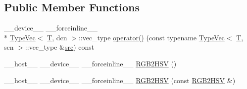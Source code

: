 \subsection*{Public Member Functions}
\begin{DoxyCompactItemize}
\item 
\-\_\-\-\_\-device\-\_\-\-\_\- \-\_\-\-\_\-forceinline\-\_\-\-\_\- \\*
\hyperlink{structcv_1_1gpu_1_1device_1_1TypeVec}{Type\-Vec}$<$ \hyperlink{calib3d_8hpp_a3efb9551a871ddd0463079a808916717}{T}, dcn $>$\-::vec\-\_\-type \hyperlink{structcv_1_1gpu_1_1device_1_1color__detail_1_1RGB2HSV_a51fa9b0ee1e0de31bade9b6a42034452}{operator()} (const typename \hyperlink{structcv_1_1gpu_1_1device_1_1TypeVec}{Type\-Vec}$<$ \hyperlink{calib3d_8hpp_a3efb9551a871ddd0463079a808916717}{T}, scn $>$\-::vec\-\_\-type \&\hyperlink{legacy_8hpp_a371cd109b74033bc4366f584edd3dacc}{src}) const 
\item 
\-\_\-\-\_\-host\-\_\-\-\_\- \-\_\-\-\_\-device\-\_\-\-\_\- \-\_\-\-\_\-forceinline\-\_\-\-\_\- \hyperlink{structcv_1_1gpu_1_1device_1_1color__detail_1_1RGB2HSV_a4d6f121707b270bacbf847cf45a61275}{R\-G\-B2\-H\-S\-V} ()
\item 
\-\_\-\-\_\-host\-\_\-\-\_\- \-\_\-\-\_\-device\-\_\-\-\_\- \-\_\-\-\_\-forceinline\-\_\-\-\_\- \hyperlink{structcv_1_1gpu_1_1device_1_1color__detail_1_1RGB2HSV_af5ecc5cc5893f63b07412867eb271dbf}{R\-G\-B2\-H\-S\-V} (const \hyperlink{structcv_1_1gpu_1_1device_1_1color__detail_1_1RGB2HSV}{R\-G\-B2\-H\-S\-V} \&)
\end{DoxyCompactItemize}


